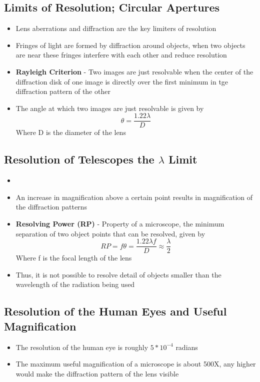 \subsection{Limits of Resolution; Circular Apertures}
\begin{itemize}
    \item Lens aberrations and diffraction are the key limiters of resolution
    \item Fringes of light are formed by diffraction around objects, when two objects are near these fringes interfere with each other and reduce resolution
    \item \textbf{Rayleigh Criterion} - Two images are just resolvable when the center of the diffraction disk of one image is directly over the first minimum in tge diffraction pattern of the other
    \item The angle at which two images are just resolvable is given by \[\theta=\frac{1.22\lambda}{D}\] Where D is the diameter of the lens
\end{itemize}

\subsection{Resolution of Telescopes the \(\lambda\) Limit}
\begin{itemize}
    \item \item An increase in magnification above a certain point results in magnification of the diffraction patterns
    \item \textbf{Resolving Power (RP)} - Property of a microscope, the minimum separation of two object points that can be resolved, given by \[RP=f\theta=\frac{1.22\lambda f}{D}\approx\frac{\lambda}{2}\]
    Where f is the focal length of the lens
    \item Thus, it is not possible to resolve detail of objects smaller than the wavelength of the radiation being used
\end{itemize}

\subsection{Resolution of the Human Eyes and Useful Magnification}
\begin{itemize}
    \item The resolution of the human eye is roughly \(5*10^{-4}\) radians
    \item The maximum useful magnification of a microscope is about 500X, any higher would make the diffraction pattern of the lens visible
\end{itemize}

